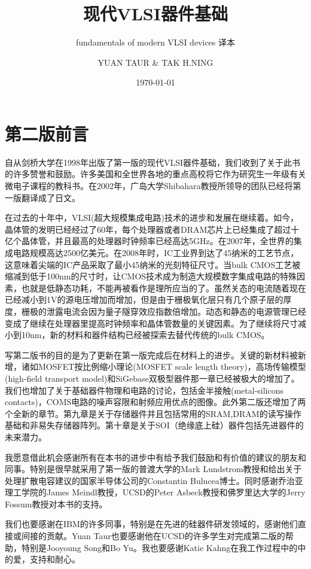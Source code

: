 \documentclass[cn,11pt,chinese]{elegantbook}
\title{现代VLSI器件基础}
\subtitle{fundamentals of modern VLSI devices 译本}
\author{YUAN TAUR \& TAK H.NING}
\institute{UCSD\& IBM}
\date{\today}
\begin{document}
	
	\maketitle
	\frontmatter
\chapter*{第二版前言}
自从剑桥大学在1998年出版了第一版的现代VLSI器件基础，我们收到了关于此书的许多赞誉和鼓励。许多美国和全世界各地的重点高校将它作为研究生一年级有关微电子课程的教科书。在2002年，广岛大学Shibahara教授所领导的团队已经将第一版翻译成了日文。

在过去的十年中，VLSI(超大规模集成电路)技术的进步和发展在继续着。如今，晶体管的发明已经经过了60年，每个处理器或者DRAM芯片上已经集成了超过十亿个晶体管，并且最高的处理器时钟频率已经高达5GHz。在2007年，全世界的集成电路规模高达2500亿美元。在2008年时，IC工业界到达了45纳米的工艺节点，这意味着尖端的IC产品采取了最小45纳米的光刻特征尺寸。当bulk CMOS工艺被缩减到低于100nm的尺寸时，让CMOS技术成为制造大规模数字集成电路的特殊因素，也就是低静态功耗，不能再被看作是理所应当的了。虽然关态的电流随着现在已经减小到1V的源电压增加而增加，但是由于栅极氧化层只有几个原子层的厚度，栅极的泄露电流会因为量子隧穿效应指数倍增加。动态和静态的电源管理已经变成了继续在处理器里提高时钟频率和晶体管数量的关键因素。为了继续将尺寸减小到10nm，新的材料和器件结构已经被探索去替代传统的bulk CMOS。

写第二版书的目的是为了更新在第一版完成后在材料上的进步。关键的新材料被新增，诸如MOSFET按比例缩小理论(MOSFET scale length theory)，高场传输模型(high-field transport model)和SiGebase双极型器件那一章已经被极大的增加了。我们也增加了关于基础器件物理和电路的讨论，包括金半接触(metal-silicons contacts)，COMS电路的噪声容限和射频应用优点的图像。此外第二版还增加了两个全新的章节。第九章是关于存储器件并且包括常用的SRAM,DRAM的读写操作基础和非易失存储器阵列。第十章是关于SOI（绝缘底上硅）器件包括先进器件的未来潜力。

我愿意借此机会感谢所有在本书的进步中有给予我们鼓励和有价值的建议的朋友和同事。特别是很早就采用了第一版的普渡大学的Mark Lundstrom教授和给出关于处理扩散电容建议的国家半导体公司的Constantin Bulucea博士。同时感谢乔治亚理工学院的James Meindl教授，UCSD的Peter Asbeck教授和佛罗里达大学的Jerry Fossum教授对本书的支持。

我们也要感谢在IBM的许多同事，特别是在先进的硅器件研发领域的，感谢他们直接或间接的贡献。Yuan Taur也要感谢他在UCSD的许多学生对完成第二版的帮助，特别是Jooyoung Song和Bo Yu。我也要感谢Katie Kahng在我工作过程中的中的爱，支持和耐心。
\end{document}
